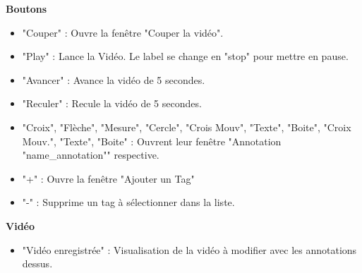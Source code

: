 \documentclass[11pt,french,a4paper]{report}
\begin{document}
\begin{multicols}{2}
\begin{small}
\large \textbf{Boutons}\normalsize
     \begin{itemize}[label=, leftmargin=*,parsep=0cm,itemsep=0cm,topsep=0cm]
        \item "Couper" : Ouvre la fenêtre "Couper la vidéo".
        \item "Play" : Lance la Vidéo. Le label se change en "stop" pour mettre en pause.
        \item "Avancer" : Avance la vidéo de 5 secondes.
        \item "Reculer" : Recule la vidéo de 5 secondes.
        \item "Croix", "Flèche", "Mesure", "Cercle", "Crois Mouv", "Texte", "Boite", "Croix Mouv.", "Texte", "Boite" : Ouvrent
        leur fenêtre "Annotation "name\_annotation"" respective.
        \item "+" : Ouvre la fenêtre "Ajouter un Tag"
        \item "-" : Supprime un tag à sélectionner dans la liste.
    \end{itemize}
    
            \large \textbf{Vidéo}\normalsize
    \begin{itemize}[label=, leftmargin=*,parsep=0cm,itemsep=0cm,topsep=0cm]
        \item "Vidéo enregistrée" : Visualisation de la vidéo à modifier avec les annotations dessus.
    \end{itemize}

\columnbreak


\end{small}
\end{multicols}
\end{document}
